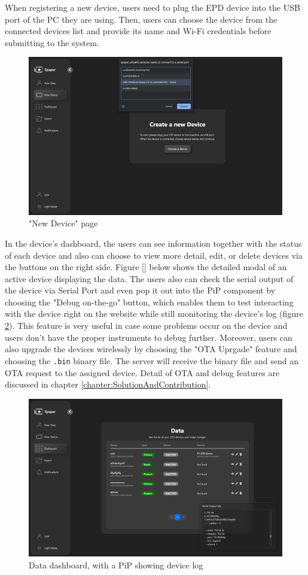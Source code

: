 \documentclass[../Main.tex]{subfiles}
\begin{document}
When registering a new device, users need to plug the \gls{EPD} device into the USB port of the PC they are using. Then, users can choose the device from the connected devices list and provide its name and Wi-Fi credentials before submitting to the system.

\begin{figure}[H]
    \centering
    \includegraphics[width=0.87\linewidth]{doc//imgs/ui_new-device.png}
    \caption{"New Device" page}
    \label{fig:ui_new-device}
\end{figure}
In the device's dashboard, the users can see information together with the status of each device and also can choose to view more detail, edit, or delete devices via the buttons on the right side. Figure \ref{} below shows the detailed modal of an active device displaying the data. The users also can check the serial output of the device via Serial Port and even pop it out into the PiP component by choosing the "Debug on-the-go" button, which enables them to test interacting with the device right on the website while still monitoring the device's log (figure \ref{fig:data-dashboard}). This feature is very useful in case some problems occur on the device and users don't have the proper instruments to debug further. Moreover, users can also upgrade the devices wirelessly by choosing the "OTA Uprgade" feature and choosing the \verb|.bin| binary file. The server will receive the binary file and send an OTA request to the assigned device. Detail of OTA and debug features are discussed in chapter \ref{chapter:SolutionAndContribution}.

\begin{figure}[H]
        \centering
        \includegraphics[width=0.87\linewidth]{doc//imgs/ui_data-dashboard.png}
        \caption{Data dashboard, with a PiP showing device log}
        \label{fig:data-dashboard}
\end{figure}
\end{document}
